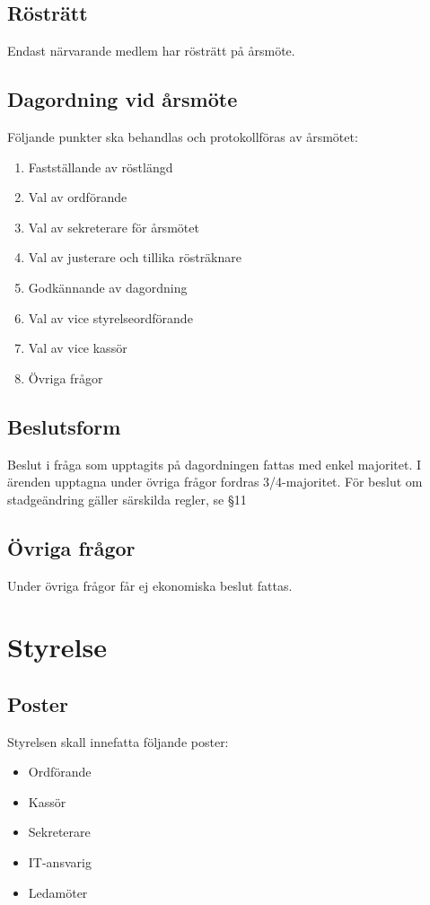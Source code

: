 \documentclass[11pt,a4paper]{article}
\begin{document}
\subsection{Rösträtt}
Endast närvarande medlem har rösträtt på årsmöte.
\subsection{Dagordning vid årsmöte}
Följande punkter ska behandlas och protokollföras av årsmötet:
\begin{enumerate}
\item Fastställande av röstlängd
\item Val av ordförande
\item Val av sekreterare för årsmötet
\item Val av justerare och tillika rösträknare
\item Godkännande av dagordning
\item Val av vice styrelseordförande
\item Val av vice kassör
\item Övriga frågor
\end{enumerate}
\subsection{Beslutsform}
Beslut i fråga som upptagits på dagordningen fattas med enkel majoritet. I ärenden upptagna under övriga frågor fordras 3/4-majoritet. För beslut om stadgeändring gäller särskilda regler, se §11
\subsection{Övriga frågor}
Under övriga frågor får ej ekonomiska beslut fattas.

\section{Styrelse}

\subsection{Poster}
Styrelsen skall innefatta följande poster:
\begin{itemize}
\item Ordförande
\item Kassör
\item Sekreterare
\item IT-ansvarig
\item Ledamöter
\end{itemize}
\end{document}
